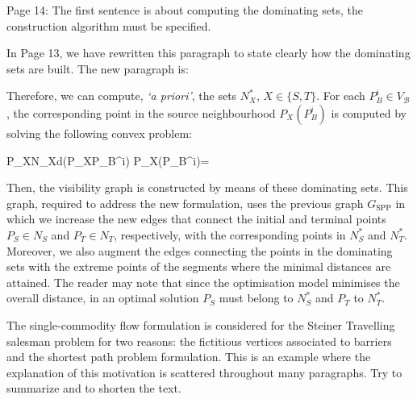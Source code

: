 \documentclass{article}
\newenvironment{reviewer}{\setcounter{pointcounter}{1}}{}
\newcommand{\point}{\text{{\selectfont \thepointcounter} \stepcounter{pointcounter}}}
\begin{document}
\begin{reviewer}
		\begin{itshape}
			Page 14: The first sentence is about computing the dominating sets, the construction algorithm must be specified.
		\end{itshape}
		
		\begin{tcolorbox}[breakable,enhanced,coltitle=black,colback=red!5!white,colframe=red!75!black,title=\textbf{Answer R1.\point},borderline={1pt}{0pt}{black},boxrule=0pt]
		In Page 13, we have rewritten this paragraph to state clearly how the dominating sets are built. The new paragraph is:
		
		\medskip
		
		Therefore, we can compute, \textit{`a priori'},  the sets $N_X^*$, $X\in\{S,T\}$. For each $P_B^i\in V_{\mathcal B}$, the corresponding point in the source neighbourhood $P_X(P_B^i)$ is computed by solving the following convex problem:
		\begin{argmini*}
			{P_X\in N_X}{d(P_XP_B^i)}
			{}{P_X(P_B^i)=}\label{eq:computing_n}
		\end{argmini*}
		
		Then, the visibility graph is constructed by means of these dominating sets.
		This graph, required to address the new formulation, uses the previous graph $G_{\text{SPP}}$ in which we increase the new edges that connect the initial and terminal points $P_S\in N_S$ and $P_T\in N_T$, respectively, with the corresponding points in $N_S^*$ and $N_T^*$. Moreover, we also augment the edges connecting the points in the dominating sets with the extreme points of the segments where the minimal distances are attained. The reader may note that since the optimisation model minimises the overall distance, in an optimal solution $P_S$ must belong to $N_S^*$ and $P_T$ to $N_T^*$.
			

		\end{tcolorbox}
		
		\begin{itshape}
			The single-commodity flow formulation is considered for the Steiner Travelling salesman
			problem for two reasons: the fictitious vertices associated to barriers and the shortest path
			problem formulation. This is an example where the explanation of this motivation is scattered
			throughout many paragraphs. Try to summarize and to shorten the text.
		\end{itshape}
		

\end{reviewer}
\end{document}
